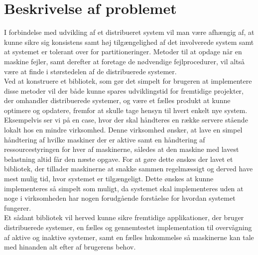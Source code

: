 \documentclass[a4paper,12pt]{article}
\begin{document}
\section{Beskrivelse af problemet}
I forbindelse med udvikling af et distribueret system vil man være afhængig af, at kunne sikre sig konsistens samt høj tilgængelighed af det involverede system samt at systemet er tolerant over for partitioneringer. Metoder til at opdage når en maskine fejler, samt derefter at foretage de nødvendige fejlprocedurer, vil altså være at finde i størstedelen af de distribuerede systemer.\\
Ved at konstruere et bibliotek, som gør det simpelt for brugeren at implementere disse metoder vil der både kunne spares udviklingstid for fremtidige projekter, der omhandler distribuerede systemer, og være et fælles produkt at kunne optimere og opdatere, fremfor at skulle tage hensyn til hvert enkelt nye system. 
\\[5px]
Eksempelvis ser vi på en case, hvor der skal håndteres en række servere stående lokalt hos en mindre virksomhed. Denne virksomhed ønsker, at lave en simpel håndtering af hvilke maskiner der er aktive samt en håndtering af ressourcestyringen for hver af maskinerne, således at den maskine med lavest belastning altid får den næste opgave. For at gøre dette ønskes der lavet et bibliotek, der tillader maskinerne at snakke sammen regelmæssigt og derved have mest mulig tid, hvor systemet er tilgængeligt. Dette ønskes at kunne implementeres så simpelt som muligt, da systemet skal implementeres uden at noge i virksomheden har nogen forudgående forståelse for hvordan systemet fungerer.
\\[5px]
Et sådant bibliotek vil herved kunne sikre fremtidige applikationer, der bruger distribuerede systemer, en fælles og gennemtestet implementation til overvågning af aktive og inaktive systemer, samt en fælles hukommelse så maskinerne kan tale med hinanden alt efter af brugerens behov.
\end{document}
